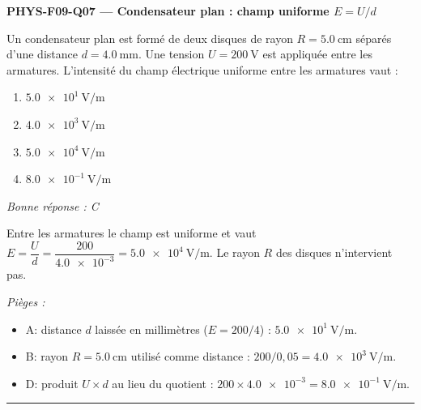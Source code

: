 \documentclass[11pt,a4paper]{article}
\begin{document}
\noindent\textbf{PHYS-F09-Q07 --- Condensateur plan : champ uniforme $E=U/d$}\par
Un condensateur plan est formé de deux disques de rayon $R=\qty{5.0}{\centi\metre}$ séparés d'une distance $d=\qty{4.0}{\milli\metre}$. Une tension $U=\qty{200}{\volt}$ est appliquée entre les armatures. L'intensité du champ électrique uniforme entre les armatures vaut :
\begin{center}
\end{center}
\begin{enumerate}[label=\Alph*)]
\item $\qty{5.0e1}{\volt\per\metre}$
\item $\qty{4.0e3}{\volt\per\metre}$
\item $\qty{5.0e4}{\volt\per\metre}$
\item $\qty{8.0e-1}{\volt\per\metre}$
\end{enumerate}
\textit{Bonne réponse : C}\par
Entre les armatures le champ est uniforme et vaut $E=\dfrac{U}{d}=\dfrac{200}{\num{4.0e-3}}=\qty{5.0e4}{\volt\per\metre}$. Le rayon $R$ des disques n'intervient pas.\par
\textit{Pièges :}
\begin{itemize}
\item A: distance $d$ laissée en millimètres ($E=200/4$) : $\qty{5.0e1}{\volt\per\metre}$.
\item B: rayon $R=\qty{5.0}{\centi\metre}$ utilisé comme distance : $200/0{,}05=\qty{4.0e3}{\volt\per\metre}$.
\item D: produit $U\times d$ au lieu du quotient : $200\times\num{4.0e-3}=\qty{8.0e-1}{\volt\per\metre}$.
\end{itemize}
\vspace{8pt}\hrule\vspace{8pt}
\end{document}

